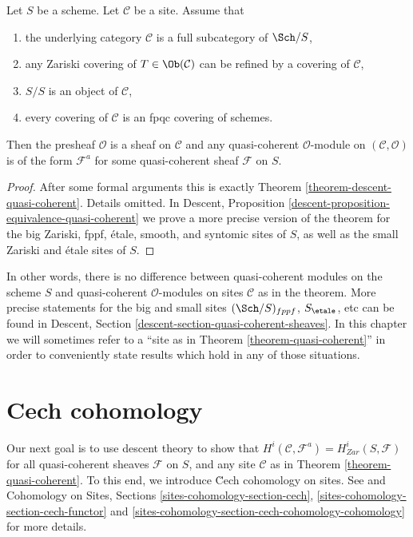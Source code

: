 \begin{theorem}
\label{theorem-quasi-coherent}
Let $S$ be a scheme.
Let $\mathcal{C}$ be a site. Assume that
\begin{enumerate}
\item the underlying category $\mathcal{C}$ is a
full subcategory of $\Sch/S$,
\item any Zariski covering of $T \in \Ob(\mathcal{C})$
can be refined by a covering of $\mathcal{C}$,
\item $S/S$ is an object of $\mathcal{C}$,
\item every covering of $\mathcal{C}$ is an fpqc covering of schemes.
\end{enumerate}
Then the presheaf $\mathcal{O}$ is a sheaf on $\mathcal{C}$ and
any quasi-coherent $\mathcal{O}$-module on $(\mathcal{C}, \mathcal{O})$
is of the form $\mathcal{F}^a$ for some quasi-coherent sheaf
$\mathcal{F}$ on $S$.
\end{theorem}

\begin{proof}
After some formal arguments this is exactly Theorem
\ref{theorem-descent-quasi-coherent}. Details omitted. In
Descent, Proposition \ref{descent-proposition-equivalence-quasi-coherent}
we prove a more precise version of the theorem for the
big Zariski, fppf, \'etale, smooth, and syntomic sites of $S$,
as well as the small Zariski and \'etale sites of $S$.
\end{proof}

\noindent
In other words, there is no difference between quasi-coherent
modules on the scheme $S$ and quasi-coherent $\mathcal{O}$-modules
on sites $\mathcal{C}$ as in the theorem. More precise statements
for the big and small sites $(\Sch/S)_{fppf}$, $S_\etale$, etc
can be found in
Descent, Section \ref{descent-section-quasi-coherent-sheaves}.
In this chapter we will sometimes refer to a
``site as in Theorem \ref{theorem-quasi-coherent}''
in order to conveniently state results which hold in any of those
situations.






\section{Cech cohomology}
\label{section-cech-cohomology}

\noindent
Our next goal is to use descent theory to show that
$H^i(\mathcal{C}, \mathcal{F}^a) = H_{Zar}^i(S, \mathcal{F})$
for all quasi-coherent sheaves $\mathcal{F}$ on $S$, and
any site $\mathcal{C}$ as in Theorem \ref{theorem-quasi-coherent}.
To this end, we introduce \u Cech cohomology on sites.
See \cite{ArtinTopologies} and
Cohomology on Sites, Sections \ref{sites-cohomology-section-cech},
\ref{sites-cohomology-section-cech-functor}
and \ref{sites-cohomology-section-cech-cohomology-cohomology}
for more details.

